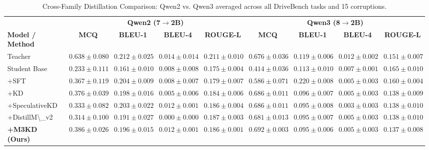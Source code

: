 \begin{table}[t]
\centering
\caption{Cross-Family Distillation Comparison: Qwen2 vs. Qwen3 averaged across all DriveBench tasks and 15 corruptions.}
\label{tab:qwen2_vs_qwen3_distillation_summary}
\footnotesize
\setlength{\tabcolsep}{3pt}
\renewcommand{\arraystretch}{1.15}
\begin{tabular}{l cccc | cccc}
\toprule
 & \multicolumn{4}{c}{\textbf{Qwen2 (7$\rightarrow$2B)}} & \multicolumn{4}{c}{\textbf{Qwen3 (8$\rightarrow$2B)}} \\
\cmidrule(lr){2-5} \cmidrule(l){6-9}
\textbf{Model / Method} & \textbf{MCQ} & \textbf{BLEU-1} & \textbf{BLEU-4} & \textbf{ROUGE-L} & \textbf{MCQ} & \textbf{BLEU-1} & \textbf{BLEU-4} & \textbf{ROUGE-L} \\
\midrule
\rowcolor{black!4} Teacher & $0.638 \pm 0.080$ & $0.212 \pm 0.025$ & $0.014 \pm 0.014$ & $0.211 \pm 0.010$ & $0.676 \pm 0.036$ & $0.119 \pm 0.006$ & $0.012 \pm 0.002$ & $0.151 \pm 0.007$ \\
\rowcolor{black!4} Student Base & $0.233 \pm 0.111$ & $0.161 \pm 0.010$ & $0.008 \pm 0.008$ & $0.175 \pm 0.004$ & $0.414 \pm 0.036$ & $0.113 \pm 0.010$ & $0.007 \pm 0.001$ & $0.165 \pm 0.010$ \\
\midrule
+SFT & $0.367 \pm 0.119$ & $0.204 \pm 0.009$ & $0.008 \pm 0.007$ & $0.179 \pm 0.007$ & $0.586 \pm 0.071$ & $0.220 \pm 0.008$ & $0.005 \pm 0.003$ & $0.160 \pm 0.004$ \\
+KD & $0.376 \pm 0.039$ & $0.198 \pm 0.016$ & $0.005 \pm 0.006$ & $0.184 \pm 0.006$ & $0.686 \pm 0.011$ & $0.096 \pm 0.007$ & $0.005 \pm 0.003$ & $0.138 \pm 0.009$ \\
+SpeculativeKD & $0.333 \pm 0.082$ & $0.203 \pm 0.022$ & $0.012 \pm 0.001$ & $0.186 \pm 0.004$ & $0.686 \pm 0.011$ & $0.095 \pm 0.008$ & $0.003 \pm 0.003$ & $0.138 \pm 0.010$ \\
+DistillM\textbackslash{}\_v2 & $0.314 \pm 0.100$ & $0.191 \pm 0.027$ & $0.000 \pm 0.000$ & $0.187 \pm 0.003$ & $0.681 \pm 0.013$ & $0.095 \pm 0.007$ & $0.005 \pm 0.003$ & $0.138 \pm 0.010$ \\
\textbf{+M3KD (Ours)} & \textbf{$0.386 \pm 0.026$} & \textbf{$0.196 \pm 0.015$} & \textbf{$0.012 \pm 0.001$} & \textbf{$0.186 \pm 0.001$} & \textbf{$0.692 \pm 0.003$} & \textbf{$0.095 \pm 0.006$} & \textbf{$0.005 \pm 0.003$} & \textbf{$0.137 \pm 0.008$} \\
\bottomrule
\end{tabular}
\end{table}
